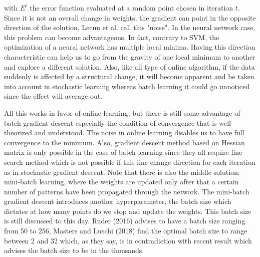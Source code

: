 \documentclass[a4paper,12pt]{article}
\numberwithin{equation}{section}
\begin{document}
\noindent
with $E^t$ the error function evaluated at a random point chosen in iteration $t$. Since it is not an overall change in weights, the gradient can point in the opposite direction of the solution, Lecun et al. call this "noise". In the neural network case, this problem can become advantageous. In fact, contrary to SVM, the optimization of a neural network has multiple local minima. Having this direction characteristic can help us to go from the gravity of one local minimum to another and explore a different solution. Also, like all type of online algorithm, if the data suddenly is affected by a structural change, it will become apparent and be taken into account in stochastic learning whereas batch learning it could go unnoticed since the effect will average out. \par
All this works in favor of online learning, but there is still some advantage of batch gradient descent especially the condition of convergence that is well theorized and understood. The noise in online learning disables us to have full convergence to the minimum. Also, gradient descent method based on Hessian matrix is only possible in the case of batch learning since they all require line search method which is not possible if this line change direction for each iteration as in stochastic gradient descent. Note that there is also the middle solution: mini-batch learning, where the weights are updated only after that a certain number of patterns have been propagated through the network. The mini-batch gradient descent introduces another hyperparameter, the batch size which dictates at how many points do we stop and update the weights. This batch size is still discussed to this day. Ruder (2016) advises to have a batch size ranging from 50 to 256, Masters and Luschi (2018) find the optimal batch size to range between 2 and 32 which, as they say, is in contradiction with recent result which advises the batch size to be in the thousands.
\end{document}
